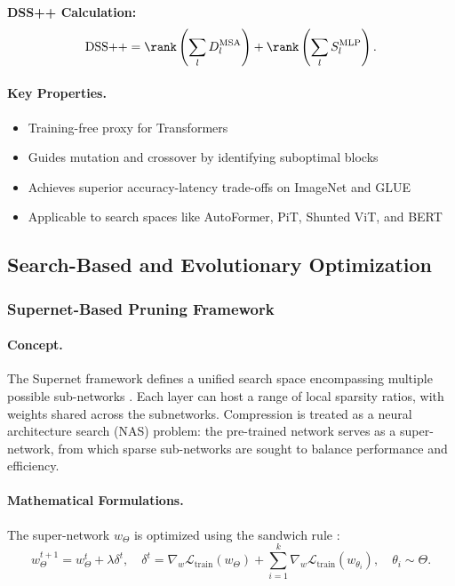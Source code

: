 \textbf{DSS++ Calculation:}
\[
\text{DSS++} = \rank\left( \sum_l D_l^{\text{MSA}} \right) + \rank\left( \sum_l S_l^{\text{MLP}} \right).
\]

\paragraph{Key Properties.}
\begin{itemize}[nosep]
	\item Training-free proxy for Transformers
	\item Guides mutation and crossover by identifying suboptimal blocks
	\item Achieves superior accuracy-latency trade-offs on ImageNet and GLUE
	\item Applicable to search spaces like AutoFormer, PiT, Shunted ViT, and BERT
\end{itemize}

\subsection{Search-Based and Evolutionary Optimization}

\subsubsection{Supernet-Based Pruning Framework}

\paragraph{Concept.} 
The Supernet framework defines a unified search space encompassing multiple possible sub-networks \cite{Sukthanker2024}. Each layer can host a range of local sparsity ratios, with weights shared across the subnetworks. Compression is treated as a neural architecture search (NAS) problem: the pre-trained network serves as a super-network, from which sparse sub-networks are sought to balance performance and efficiency.

\paragraph{Mathematical Formulations.}
The super-network \(w_\Theta\) is optimized using the sandwich rule \cite{Yu2020}:
\[
w_{\Theta}^{t+1} = w_{\Theta}^t + \lambda \delta^t, \quad 
\delta^t = \nabla_w \mathcal{L}_{\text{train}}(w_\Theta) + \sum_{i=1}^k \nabla_w \mathcal{L}_{\text{train}}(w_{\theta_i}), \quad \theta_i \sim \Theta.
\]

